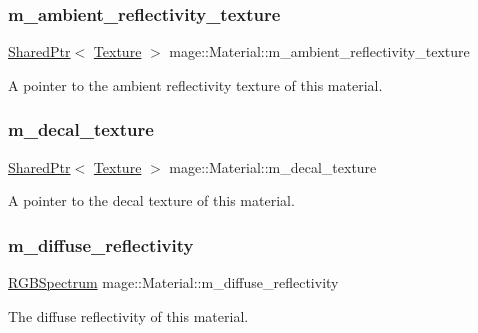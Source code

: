 \subsubsection{\texorpdfstring{m\+\_\+ambient\+\_\+reflectivity\+\_\+texture}{m\_ambient\_reflectivity\_texture}}
{\footnotesize\ttfamily \hyperlink{namespacemage_a1e01ae66713838a7a67d30e44c67703e}{Shared\+Ptr}$<$ \hyperlink{classmage_1_1_texture}{Texture} $>$ mage\+::\+Material\+::m\+\_\+ambient\+\_\+reflectivity\+\_\+texture\hspace{0.3cm}{\ttfamily [private]}}

A pointer to the ambient reflectivity texture of this material. \hypertarget{structmage_1_1_material_acdab45e5d78ddbb7f717d9db67ff3fcf}{}\label{structmage_1_1_material_acdab45e5d78ddbb7f717d9db67ff3fcf} 
\subsubsection{\texorpdfstring{m\+\_\+decal\+\_\+texture}{m\_decal\_texture}}
{\footnotesize\ttfamily \hyperlink{namespacemage_a1e01ae66713838a7a67d30e44c67703e}{Shared\+Ptr}$<$ \hyperlink{classmage_1_1_texture}{Texture} $>$ mage\+::\+Material\+::m\+\_\+decal\+\_\+texture\hspace{0.3cm}{\ttfamily [private]}}

A pointer to the decal texture of this material. \hypertarget{structmage_1_1_material_afd2cc813023698e52edc01b267a17e6c}{}\label{structmage_1_1_material_afd2cc813023698e52edc01b267a17e6c} 
\subsubsection{\texorpdfstring{m\+\_\+diffuse\+\_\+reflectivity}{m\_diffuse\_reflectivity}}
{\footnotesize\ttfamily \hyperlink{structmage_1_1_r_g_b_spectrum}{R\+G\+B\+Spectrum} mage\+::\+Material\+::m\+\_\+diffuse\+\_\+reflectivity\hspace{0.3cm}{\ttfamily [private]}}

The diffuse reflectivity of this material. \hypertarget{structmage_1_1_material_a5193e30d3875695c96526a85edc84b88}{}\label{structmage_1_1_material_a5193e30d3875695c96526a85edc84b88} 
